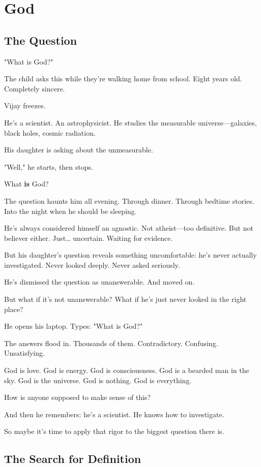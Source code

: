 \documentclass[11pt,twoside]{book}
\begin{document}
\chapter{God}

\section*{The Question}

"What is God?"

The child asks this while they're walking home from school. Eight years old. Completely sincere.

Vijay freezes.

He's a scientist. An astrophysicist. He studies the measurable universe—galaxies, black holes, cosmic radiation.

His daughter is asking about the unmeasurable.

"Well," he starts, then stops.

What \textbf{is} God?

The question haunts him all evening. Through dinner. Through bedtime stories. Into the night when he should be sleeping.

He's always considered himself an agnostic. Not atheist—too definitive. But not believer either. Just\ldots{} uncertain. Waiting for evidence.

But his daughter's question reveals something uncomfortable: he's never actually investigated. Never looked deeply. Never asked seriously.

He's dismissed the question as unanswerable. And moved on.

But what if it's not unanswerable? What if he's just never looked in the right place?

He opens his laptop. Types: "What is God?"

The answers flood in. Thousands of them. Contradictory. Confusing. Unsatisfying.

God is love. God is energy. God is consciousness. God is a bearded man in the sky. God is the universe. God is nothing. God is everything.

How is anyone supposed to make sense of this?

And then he remembers: he's a scientist. He knows how to investigate.

So maybe it's time to apply that rigor to the biggest question there is.

\section*{The Search for Definition}
\end{document}

